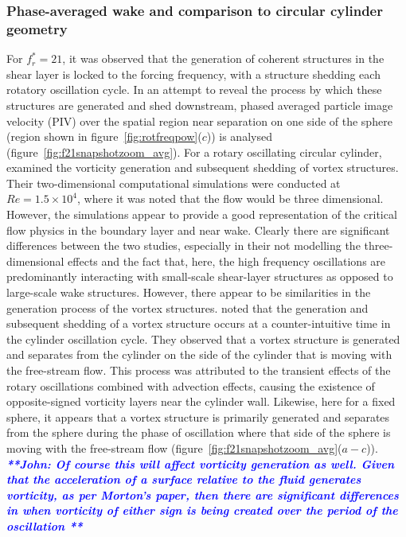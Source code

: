 \documentclass[3p]{elsarticle}
\newcommand{\freqrat}{\ensuremath{f_r^*}}
\newcommand{\js}[1]{{\textcolor{blue}{{\bf{\it{ **John: #1 **}}}}}}
\begin{document}
\subsubsection{Phase-averaged wake and comparison to circular cylinder geometry}
For $\freqrat=21$, it was observed that the generation of coherent structures in the shear layer is locked to the forcing frequency, with a structure shedding
each rotatory oscillation cycle. In an attempt to reveal the process
by which these structures are generated and shed downstream, phased
averaged particle image velocity (PIV) over the spatial region near separation on one side of the sphere (region shown in
figure~\ref{fig:rotfreqpow}($c$)) is
analysed (figure~\ref{fig:f21snapshotzoom_avg}). For a rotary
oscillating circular cylinder, \citet{Shiels2001} examined the
vorticity generation and subsequent shedding of vortex structures. Their two-dimensional computational simulations were conducted
at $Re=1.5 \times 10^4$, where it was noted that the flow would be
three dimensional. However, the simulations appear to provide a
good representation of the critical flow physics in the boundary layer
and near wake. Clearly there are significant differences
between the two studies, especially in their not modelling  the three-dimensional effects
and the fact that, here, the high frequency oscillations are
predominantly interacting with small-scale shear-layer structures as
opposed to large-scale wake structures. However, there appear to be
similarities in the generation process of the vortex structures. \citet{Shiels2001} noted that the
generation and subsequent shedding of a vortex structure occurs at a
counter-intuitive time in the cylinder oscillation cycle. They
observed that a vortex structure is generated and separates from the
cylinder on the side of the cylinder that is moving with the
free-stream flow. This process was attributed to the transient effects
of the rotary oscillations combined with advection effects, causing
the existence of opposite-signed vorticity layers near the cylinder
wall. Likewise, here for a fixed sphere, it appears that a vortex
structure is primarily generated and separates from the sphere during
the phase of oscillation where that side of the sphere is moving with
the free-stream flow (figure~\ref{fig:f21snapshotzoom_avg}($a-c$)). 
\js{Of course this will affect vorticity generation as well. Given that
the acceleration of a surface relative to the fluid generates vorticity, as per 
Morton's paper, then there are significant differences in when vorticity of either
sign is being created over the period of the oscillation}
\end{document}
